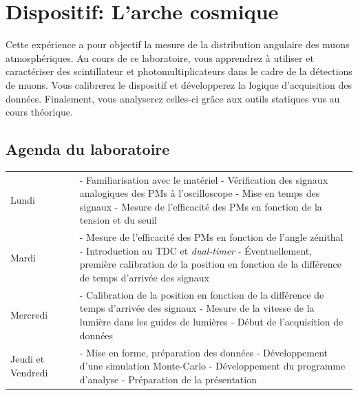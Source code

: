 \section{Dispositif: L'arche cosmique}
\label{sect:Muon_arche}

Cette expérience a pour objectif la mesure de la distribution angulaire des muons atmosphériques.
Au cours de ce laboratoire, vous apprendrez à utiliser et caractériser des scintillateur et photomultiplicateurs dans le cadre de la détections de muons.
Vous calibrerez le dispositif et développerez la logique d'acquisition des données.
Finalement, vous analyserez celles-ci grâce aux outils statiques vus au cours théorique.

\subsection{Agenda du laboratoire}
\begin{tabular}{p{0.2\linewidth} p{0.8\linewidth}}
Lundi & - Familiarisation avec le matériel\newline
		- Vérification des signaux analogiques des PMs à l'oscilloscope\newline
		- Mise en temps des signaux\newline
		- Mesure de l'efficacité des PMs en fonction de la tension et du seuil\\

Mardi & - Mesure de l'efficacité des PMs en fonction de l'angle zénithal\newline
		- Introduction au TDC et \textit{dual-timer}\newline
		- Éventuellement, première calibration de la position en fonction de la différence de temps d'arrivée des signaux\\

Mercredi & - Calibration de la position en fonction de la différence de temps d'arrivée des signaux\newline
		- Mesure de la vitesse de la lumière dans les guides de lumières\newline
		- Début de l'acquisition de données\\

Jeudi et Vendredi & - Mise en forme, préparation des données\newline
		- Développement d'une simulation Monte-Carlo\newline
		- Développement du programme d'analyse\newline
		- Préparation de la présentation\\
\end{tabular} 

